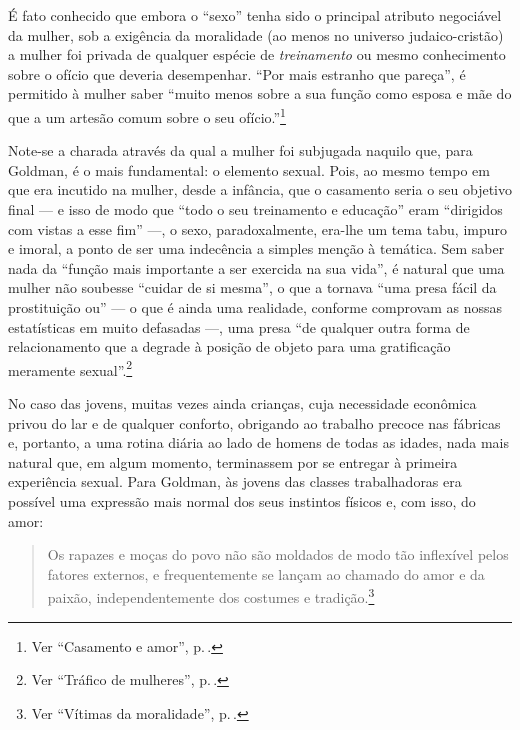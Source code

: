 É fato conhecido que embora o ``sexo'' tenha
sido o principal atributo negociável da mulher, sob a
exigência da moralidade (ao menos no universo
judaico-cristão) a mulher foi privada de qualquer espécie de
\textit{treinamento} ou mesmo conhecimento sobre o ofício que
deveria desempenhar. ``Por mais estranho que pareça'',
é permitido à mulher saber ``muito
menos sobre a sua função como esposa e mãe do que a um artesão comum
sobre o seu ofício.''\footnote{Ver ``Casamento e amor'', p.\,\pageref{artesao}.}

Note-se a charada através da qual a mulher
foi subjugada naquilo que, para Goldman, é o mais fundamental: o elemento
sexual. Pois, ao mesmo tempo em que era incutido na mulher, desde a
infância, que o casamento seria o seu objetivo final --- e isso de modo
que ``todo o seu treinamento e educação'' eram ``dirigidos com vistas a
esse fim'' ---, o sexo, paradoxalmente, era-lhe um tema tabu, impuro e
imoral, a ponto de ser uma indecência a simples menção à temática. Sem
saber nada da ``função mais importante a ser exercida na sua vida'',
é natural que uma mulher não soubesse ``cuidar de si mesma'', o que a tornava ``uma presa
fácil da prostituição ou'' --- o que é ainda uma realidade, conforme
comprovam as nossas estatísticas em muito defasadas ---, uma presa ``de
qualquer outra forma de relacionamento que a degrade à posição de
objeto para uma gratificação meramente sexual''.\footnote{Ver ``Tráfico de mulheres'', p.\,\pageref{objeto}.}

No caso das jovens, muitas vezes ainda crianças, cuja necessidade
econômica privou do lar e de qualquer conforto, obrigando ao trabalho
precoce nas fábricas e, portanto, a uma rotina diária ao lado de homens
de todas as idades, nada mais natural que, em algum momento, terminassem
por se entregar à primeira experiência sexual. Para Goldman, às jovens
das classes trabalhadoras era possível uma expressão mais normal dos
seus instintos físicos e, com isso, do amor:

\begin{quote}
Os rapazes e moças do povo não são moldados de modo
tão inflexível pelos fatores externos, e frequentemente se lançam ao
chamado do amor e da paixão, independentemente dos costumes e tradição.\footnote{Ver ``Vítimas da moralidade'', p.\,\pageref{tradicao}.}
\end{quote}

